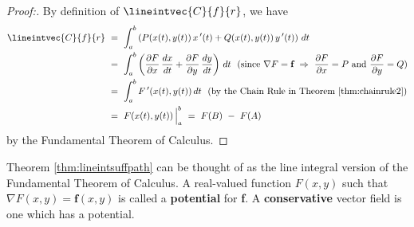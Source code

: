\begin{proof}[Proof:]
 By definition of $\lineintvec{C}{f}{r}$, we have
 \begin{align*}
  \lineintvec{C}{f}{r} ~&=~ \int_a^b \left( P(x(t),y(t))\,x\,'(t) + Q(x(t),y(t))\,y\,'(t) \right)\,dt\\
   &=~ \int_a^b \left( \frac{\partial F}{\partial x}\,\frac{dx}{dt} + \frac{\partial F}{\partial y}\,\frac{dy}{dt}
   \right)\,dt ~~\text{(since $\nabla F = \textbf{f} ~\Rightarrow~ \frac{\partial F}{\partial x} = P$ and
   $\frac{\partial F}{\partial y} = Q$)}\\
   &=~ \int_a^b F\,'(x(t),y(t))\,dt ~~\text{(by the Chain Rule in Theorem \ref{thm:chainrule2})}\\
   &=~ F(x(t),y(t)) \,\Big|_a^b ~=~ F(B) ~-~ F(A)
 \end{align*}
 by the Fundamental Theorem of Calculus.
 \vspace{-3mm}
\end{proof}
   Theorem \ref{thm:lineintsuffpath} can be thought of as the line integral version of the Fundamental Theorem of
Calculus. A real-valued function $F(x,y)$ such that $\nabla F(x,y) = \textbf{f}(x,y)$ is called a \textbf{potential}
for \textbf{f}. A \textbf{conservative} vector field is one which has a potential.

